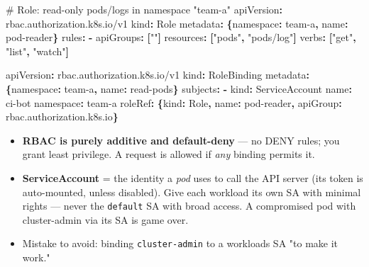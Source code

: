 \documentclass[11pt]{article}
\providecommand{\tightlist}{\setlength{\itemsep}{1pt}\setlength{\parskip}{0pt}}
\newenvironment{Shaded}{\begin{snugshade}}{\end{snugshade}}
\newcommand{\AttributeTok}[1]{\textcolor[rgb]{0.16,0.50,0.73}{#1}}
\newcommand{\CommentTok}[1]{\textcolor[rgb]{0.48,0.49,0.49}{#1}}
\newcommand{\FunctionTok}[1]{\textcolor[rgb]{0.56,0.27,0.68}{#1}}
\newcommand{\KeywordTok}[1]{\textcolor[rgb]{0.81,0.81,0.76}{\textbf{#1}}}
\newcommand{\StringTok}[1]{\textcolor[rgb]{0.96,0.31,0.31}{#1}}
\begin{document}
\begin{Shaded}
\begin{Highlighting}[]
\CommentTok{\# Role: read{-}only pods/logs in namespace "team{-}a"}
\FunctionTok{apiVersion}\KeywordTok{:}\AttributeTok{ rbac.authorization.k8s.io/v1}
\FunctionTok{kind}\KeywordTok{:}\AttributeTok{ Role}
\FunctionTok{metadata}\KeywordTok{:}\AttributeTok{ }\KeywordTok{\{}\FunctionTok{namespace}\KeywordTok{:}\AttributeTok{ team{-}a}\KeywordTok{,}\AttributeTok{ }\FunctionTok{name}\KeywordTok{:}\AttributeTok{ pod{-}reader}\KeywordTok{\}}
\FunctionTok{rules}\KeywordTok{:}
\AttributeTok{  }\KeywordTok{{-}}\AttributeTok{ }\FunctionTok{apiGroups}\KeywordTok{:}\AttributeTok{ }\KeywordTok{[}\StringTok{""}\KeywordTok{]}
\AttributeTok{    }\FunctionTok{resources}\KeywordTok{:}\AttributeTok{ }\KeywordTok{[}\StringTok{"pods"}\KeywordTok{,}\AttributeTok{ }\StringTok{"pods/log"}\KeywordTok{]}
\AttributeTok{    }\FunctionTok{verbs}\KeywordTok{:}\AttributeTok{ }\KeywordTok{[}\StringTok{"get"}\KeywordTok{,}\AttributeTok{ }\StringTok{"list"}\KeywordTok{,}\AttributeTok{ }\StringTok{"watch"}\KeywordTok{]}

\FunctionTok{apiVersion}\KeywordTok{:}\AttributeTok{ rbac.authorization.k8s.io/v1}
\FunctionTok{kind}\KeywordTok{:}\AttributeTok{ RoleBinding}
\FunctionTok{metadata}\KeywordTok{:}\AttributeTok{ }\KeywordTok{\{}\FunctionTok{namespace}\KeywordTok{:}\AttributeTok{ team{-}a}\KeywordTok{,}\AttributeTok{ }\FunctionTok{name}\KeywordTok{:}\AttributeTok{ read{-}pods}\KeywordTok{\}}
\FunctionTok{subjects}\KeywordTok{:}
\AttributeTok{  }\KeywordTok{{-}}\AttributeTok{ }\FunctionTok{kind}\KeywordTok{:}\AttributeTok{ ServiceAccount}
\AttributeTok{    }\FunctionTok{name}\KeywordTok{:}\AttributeTok{ ci{-}bot}
\AttributeTok{    }\FunctionTok{namespace}\KeywordTok{:}\AttributeTok{ team{-}a}
\FunctionTok{roleRef}\KeywordTok{:}\AttributeTok{ }\KeywordTok{\{}\FunctionTok{kind}\KeywordTok{:}\AttributeTok{ Role}\KeywordTok{,}\AttributeTok{ }\FunctionTok{name}\KeywordTok{:}\AttributeTok{ pod{-}reader}\KeywordTok{,}\AttributeTok{ }\FunctionTok{apiGroup}\KeywordTok{:}\AttributeTok{ rbac.authorization.k8s.io}\KeywordTok{\}}
\end{Highlighting}
\end{Shaded}

\begin{itemize}
\tightlist
\item
  \textbf{RBAC is purely additive and default-deny} --- no DENY rules; you grant least privilege. A request is allowed if \emph{any} binding permits it.
\item
  \textbf{ServiceAccount} = the identity a \emph{pod} uses to call the API server (its token is auto-mounted, unless disabled). Give each workload its own SA with minimal rights --- never the \texttt{default} SA with broad access. A compromised pod with cluster-admin via its SA is game over.
\item
  Mistake to avoid: binding \texttt{cluster-admin} to a workload\textquotesingle s SA "to make it work."
\end{itemize}
\end{document}
